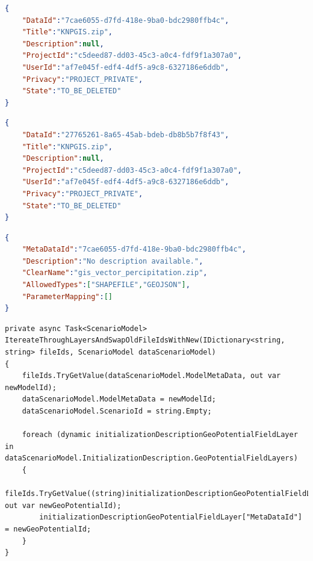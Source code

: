 \newpage
\begin{lstlisting}[caption={Snippet of archived MARS metadata resource}, language=json,firstnumber=1, captionpos=b, label={lst:marsMetadata}]
{
    "DataId":"7cae6055-d7fd-418e-9ba0-bdc2980ffb4c",
    "Title":"KNPGIS.zip",
    "Description":null,
    "ProjectId":"c5deed87-dd03-45c3-a0c4-fdf9f1a307a0",
    "UserId":"af7e045f-edf4-4df5-a9c8-6327186e6ddb",
    "Privacy":"PROJECT_PRIVATE",
    "State":"TO_BE_DELETED"
}
\end{lstlisting}

\begin{lstlisting}[caption={Snippet of the uploaded MARS metadata resource}, language=json,firstnumber=1, captionpos=b, label={lst:marsNewMetadata}]
{
    "DataId":"27765261-8a65-45ab-bdeb-db8b5b7f8f43",
    "Title":"KNPGIS.zip",
    "Description":null,
    "ProjectId":"c5deed87-dd03-45c3-a0c4-fdf9f1a307a0",
    "UserId":"af7e045f-edf4-4df5-a9c8-6327186e6ddb",
    "Privacy":"PROJECT_PRIVATE",
    "State":"TO_BE_DELETED"
}
\end{lstlisting}

\begin{lstlisting}[caption={Snippet of the archived MARS scenario resource}, language=json,firstnumber=1, captionpos=b, label={lst:marsScenario}]
{
    "MetaDataId":"7cae6055-d7fd-418e-9ba0-bdc2980ffb4c",
    "Description":"No description available.",
    "ClearName":"gis_vector_percipitation.zip",
    "AllowedTypes":["SHAPEFILE","GEOJSON"],
    "ParameterMapping":[]
}
\end{lstlisting}

\newpage
\begin{lstlisting}[language={[Sharp]C}, caption={A method in RetrieveScenarios to swap Attributes}, captionpos=b,label={lst:swapCode}]
private async Task<ScenarioModel> ItereateThroughLayersAndSwapOldFileIdsWithNew(IDictionary<string, string> fileIds, ScenarioModel dataScenarioModel)
{
    fileIds.TryGetValue(dataScenarioModel.ModelMetaData, out var newModelId);
    dataScenarioModel.ModelMetaData = newModelId;
    dataScenarioModel.ScenarioId = string.Empty;
    
    foreach (dynamic initializationDescriptionGeoPotentialFieldLayer in dataScenarioModel.InitializationDescription.GeoPotentialFieldLayers)
    {
        fileIds.TryGetValue((string)initializationDescriptionGeoPotentialFieldLayer["MetaDataId"], out var newGeoPotentialId);
        initializationDescriptionGeoPotentialFieldLayer["MetaDataId"] = newGeoPotentialId;
    }
}
\end{lstlisting}